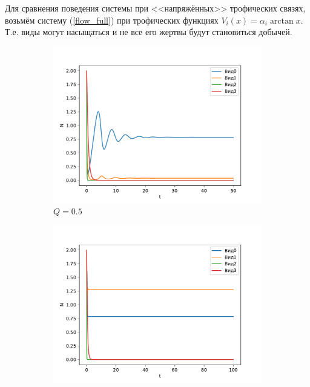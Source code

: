 Для сравнения поведения системы при <<напряжённых>> трофических связях, возьмём систему (\ref{flow_full}) при трофических функциях \( V_i(x) = \alpha_i \arctan x  \). Т.е. виды могут насыщаться и не все его жертвы будут становиться добычей.


\begin{figure}[H]
    \centering
    \begin{subfigure}[t]{.3\linewidth}
        \centering
        \includegraphics[width=\textwidth]{pictures/exp_flow/exp2_Q05.pdf}
        \caption{\(Q = 0.5\)}
    \end{subfigure}
    \begin{subfigure}[t]{.3\linewidth}
        \centering
        \includegraphics[width=\textwidth]{pictures/exp_flow/exp2_Q17.pdf}

\end{subfigure}
\end{figure}
